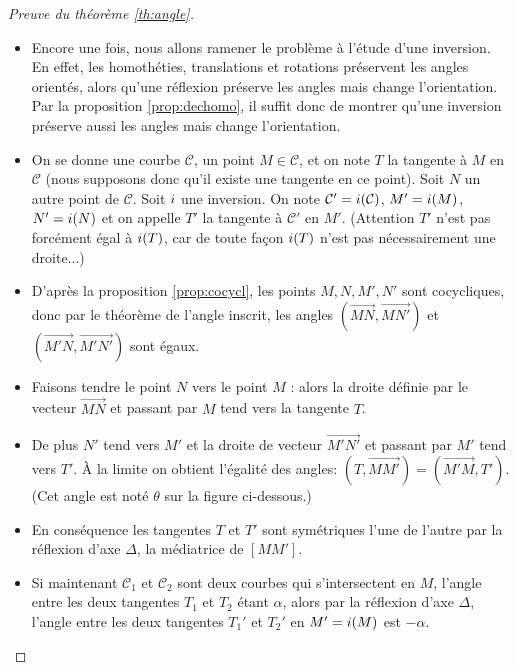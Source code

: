 \documentclass[11pt,class=report,crop=false]{standalone}
\begin{document}
\begin{proof}[Preuve du théorème \ref{th:angle}]
~
\begin{itemize}
  \item Encore une fois, nous allons ramener le problème à l'étude d'une inversion.
 En effet, les homothéties, translations et rotations préservent les angles orientés,
 alors qu'une réflexion préserve les angles mais change l'orientation. Par la 
 proposition \ref{prop:dechomo}, il suffit donc de montrer qu'une inversion préserve aussi les angles
 mais change l'orientation.
 
  \item On se donne une courbe $\mathcal{C}$, un point $M\in \mathcal{C}$, et on note
  $T$ la tangente à $M$ en $\mathcal{C}$ (nous supposons donc qu'il existe une tangente en ce point).
  Soit $N$ un autre point de $\mathcal{C}$. Soit $i$ une inversion. On note
  $\mathcal{C}'= i(\mathcal{C})$, $M' = i(M)$, $N'=i(N)$ et on appelle
  $T'$ la tangente à $\mathcal{C}'$ en $M'$. (Attention $T'$ n'est pas forcément égal à $i(T)$, car de toute façon $i(T)$ n'est pas nécessairement une droite...)

  

  
  \item D'après la proposition \ref{prop:cocycl}, les points $M,N,M',N'$ sont cocycliques,
  donc par le théorème de l'angle inscrit, les angles $(\vec{MN},\vec{MN'})$ et $(\vec{M'N},\vec{M'N'})$ sont égaux.
  

  
  \item Faisons tendre le point $N$ vers le point $M$ : alors la droite définie par le vecteur $\vec{MN}$
  et passant par $M$ tend vers la tangente $T$. 

  
  \item 
  De plus $N'$ tend vers $M'$ et la droite de vecteur $\vec{M'N'}$
  et passant par $M'$ tend vers $T'$. \`A la limite on obtient l'égalité des angles:
  $(T,\vec{MM'}) = (\vec{M'M},T')$. (Cet angle est noté $\theta$ sur la figure ci-dessous.)
  

  \item  En conséquence les tangentes $T$ et $T'$ sont symétriques l'une de l'autre par la réflexion d'axe $\Delta$, la médiatrice de $[MM']$.
  
  \item Si maintenant $\mathcal{C}_1$ et $\mathcal{C}_2$ sont deux courbes qui s'intersectent en $M$, l'angle entre
  les deux tangentes $T_1$ et $T_2$ étant $\alpha$, alors par la réflexion d'axe $\Delta$, l'angle entre les deux tangentes $T_1'$ et $T_2'$ en $M' = i(M)$ est $-\alpha$.
\end{itemize}

\end{proof}
\end{document}
